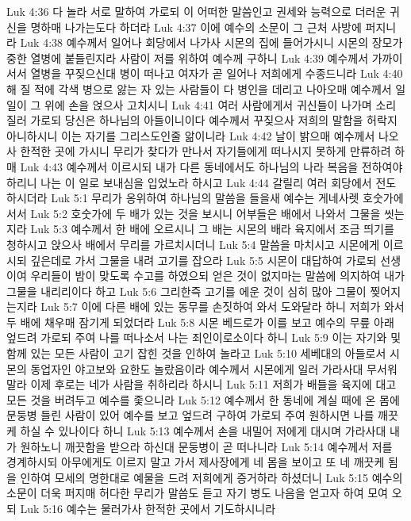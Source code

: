 Luk 4:36  다 놀라 서로 말하여 가로되 이 어떠한 말씀인고 권세와 능력으로 더러운 귀신을 명하매 나가는도다 하더라
Luk 4:37  이에 예수의 소문이 그 근처 사방에 퍼지니라
Luk 4:38  예수께서 일어나 회당에서 나가사 시몬의 집에 들어가시니 시몬의 장모가 중한 열병에 붙들린지라 사람이 저를 위하여 예수께 구하니
Luk 4:39  예수께서 가까이 서서 열병을 꾸짖으신대 병이 떠나고 여자가 곧 일어나 저희에게 수종드니라
Luk 4:40  해 질 적에 각색 병으로 앓는 자 있는 사람들이 다 병인을 데리고 나아오매 예수께서 일일이 그 위에 손을 얹으사 고치시니
Luk 4:41  여러 사람에게서 귀신들이 나가며 소리질러 가로되 당신은 하나님의 아들이니이다 예수께서 꾸짖으사 저희의 말함을 허락지 아니하시니 이는 자기를 그리스도인줄 앎이니라
Luk 4:42  날이 밝으매 예수께서 나오사 한적한 곳에 가시니 무리가 찾다가 만나서 자기들에게 떠나시지 못하게 만류하려 하매
Luk 4:43  예수께서 이르시되 내가 다른 동네에서도 하나님의 나라 복음을 전하여야 하리니 나는 이 일로 보내심을 입었노라 하시고
Luk 4:44  갈릴리 여러 회당에서 전도하시더라
Luk 5:1  무리가 옹위하여 하나님의 말씀을 들을새 예수는 게네사렛 호숫가에 서서
Luk 5:2  호숫가에 두 배가 있는 것을 보시니 어부들은 배에서 나와서 그물을 씻는지라
Luk 5:3  예수께서 한 배에 오르시니 그 배는 시몬의 배라 육지에서 조금 띄기를 청하시고 앉으사 배에서 무리를 가르치시더니
Luk 5:4  말씀을 마치시고 시몬에게 이르시되 깊은데로 가서 그물을 내려 고기를 잡으라
Luk 5:5  시몬이 대답하여 가로되 선생이여 우리들이 밤이 맞도록 수고를 하였으되 얻은 것이 없지마는 말씀에 의지하여 내가 그물을 내리리이다 하고
Luk 5:6  그리한즉 고기를 에운 것이 심히 많아 그물이 찢어지는지라
Luk 5:7  이에 다른 배에 있는 동무를 손짓하여 와서 도와달라 하니 저희가 와서 두 배에 채우매 잠기게 되었더라
Luk 5:8  시몬 베드로가 이를 보고 예수의 무릎 아래 엎드려 가로되 주여 나를 떠나소서 나는 죄인이로소이다 하니
Luk 5:9  이는 자기와 및 함께 있는 모든 사람이 고기 잡힌 것을 인하여 놀라고
Luk 5:10  세베대의 아들로서 시몬의 동업자인 야고보와 요한도 놀랐음이라 예수께서 시몬에게 일러 가라사대 무서워 말라 이제 후로는 네가 사람을 취하리라 하시니
Luk 5:11  저희가 배들을 육지에 대고 모든 것을 버려두고 예수를 좇으니라
Luk 5:12  예수께서 한 동네에 계실 때에 온 몸에 문둥병 들린 사람이 있어 예수를 보고 엎드려 구하여 가로되 주여 원하시면 나를 깨끗케 하실 수 있나이다 하니
Luk 5:13  예수께서 손을 내밀어 저에게 대시며 가라사대 내가 원하노니 깨끗함을 받으라 하신대 문둥병이 곧 떠나니라
Luk 5:14  예수께서 저를 경계하시되 아무에게도 이르지 말고 가서 제사장에게 네 몸을 보이고 또 네 깨끗케 됨을 인하여 모세의 명한대로 예물을 드려 저희에게 증거하라 하셨더니
Luk 5:15  예수의 소문이 더욱 퍼지매 허다한 무리가 말씀도 듣고 자기 병도 나음을 얻고자 하여 모여 오되
Luk 5:16  예수는 물러가사 한적한 곳에서 기도하시니라
